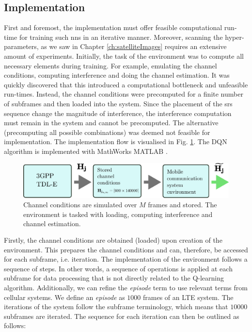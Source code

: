 \subsection{Implementation}
First and foremost, the implementation must offer feasible computational run-time for training such \glspl{nn} in an iterative manner. Moreover,  scanning the hyper-parameters, as we saw in Chapter \ref{ch:satelliteImages} requires an extensive amount of experiments. Initially, the task of the environment was to compute all necessary elements during training. For example, emulating the channel conditions, computing interference and doing the channel estimation. It was quickly discovered that this introduced a computational bottleneck and unfeasible run-times. Instead, the channel conditions were precomputed for a finite number of subframes and then loaded into the system. Since the placement of the \gls{srs} sequence change the magnitude of interference, the interference computation must remain in the system and cannot be precomputed. The alternative (precomputing all possible combinations) was deemed not feasible for implementation. The implementation flow is visualised in Fig. \ref{fig:environment_implementation}. The DQN algorithm is implemented with MathWorks MATLAB \cite{MATLABRL_toolbox}. 
\begin{figure}
    \centering
    \includegraphics{chapters/part_uplink/figures/environment_implementation.eps}
    \caption{Channel conditions are simulated over $M$ frames and stored. The environment is tasked with loading, computing interference and channel estimation.}
    \label{fig:environment_implementation}
\end{figure}

Firstly, the channel conditions are obtained (loaded) upon creation of the environment. This prepares the channel conditions and can, therefore, be accessed for each subframe, i.e. iteration. The implementation of the environment follows a sequence of steps. In other words, a sequence of operations is applied at each subframe for data processing that is not directly related to the Q-learning algorithm. Additionally, we can refine the \emph{episode} term to use relevant terms from cellular systems. We define an \emph{episode} as $1000$ frames of an LTE system. The iterations of the system follow the subframe terminology, which means that $10000$ subframes are iterated. The sequence for each iteration can then be outlined as follows:

